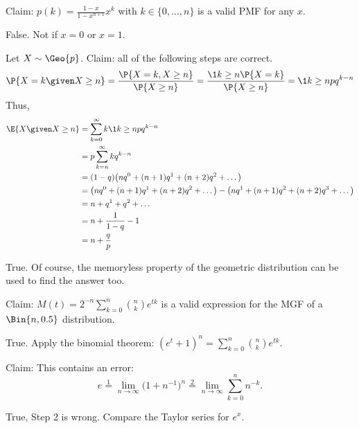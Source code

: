 \documentclass[tf-tutorial-all.tex]{subfiles}
\begin{document}
\begin{truefalse}
Claim: $p(k) = \frac{1-x}{1-x^{n+1}} x^k$ with $k \in \{0, \dots, n\}$ is a valid PMF for any $x$.
\begin{solution}
  False. Not if $x = 0$ or $x = 1$.
\end{solution}
\end{truefalse}

\begin{truefalse}
  Let $X \sim \Geo{p}$. Claim: all of the following steps are correct.
  \begin{equation*}
    \P{X = k \given X \geq n}
    = \frac{\P{X=k, X \geq n}}{\P{X \geq n}}
    = \frac{\1{k \geq n} \P{X = k}}{\P{X \geq n}}
    = \1{k \geq n} pq^{k-n}
  \end{equation*}
  Thus,
  \begin{align*}
    \E{X \given X \geq n} &= \sum_{k=0}^\infty k \1{k \geq n} pq^{k-n}\\
    &=  p \sum_{k=n}^\infty kq^{k-n}\\
    &= (1 - q) \big(n q^0 + (n+1) q^1 + (n+2) q^2 + \dots\big)\\
    &= \big(n q^0 + (n+1) q^1 + (n+2) q^2 + \dots\big) - \big(n q^1 + (n+1)q^2 + (n+2)q^3 + \dots\big)\\
    &= n + q^1 + q^2 + \dots\\
    &= n + \frac{1}{1-q} - 1\\
    &= n + \frac{q}{p}\\
  \end{align*}
\begin{solution}
    True. Of course, the memoryless property of the geometric
    distribution can be used to find the answer too.
\end{solution}
\end{truefalse}


\begin{truefalse}
Claim:  $M(t) = 2^{-n} \sum_{k=0}^n \binom{n}{k} e^{tk}$ is a valid expression for the MGF of a $\Bin{n, 0.5}$ distribution.
\begin{solution}
True. Apply the binomial theorem: $(e^t + 1)^n = \sum_{k=0}^n \binom{n}{k} e^{tk}$.
\end{solution}
\end{truefalse}

\begin{truefalse}
 Claim:  This contains an error:
  \begin{equation*}
e \stackrel 1 =  \lim_{n\to\infty} \big(1+n^{-1}\big)^n   \stackrel{2} = \lim_{n\to\infty} \sum^n_{k=0} n^{-k}.
  \end{equation*}
\begin{solution}
True, Step 2 is wrong. Compare the Taylor series for $e^{x}$.
\end{solution}
\end{truefalse}
\end{document}
